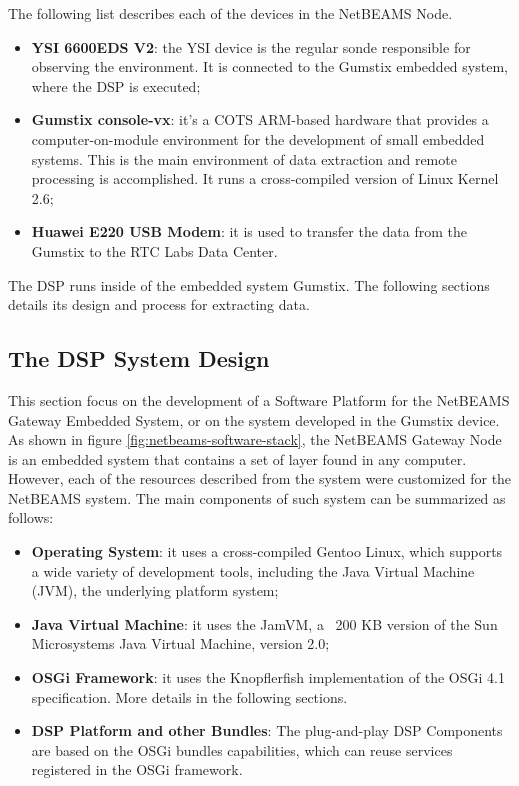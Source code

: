 The following list describes each of the devices in the NetBEAMS Node.

\begin{itemize}
  \item \textbf{YSI 6600EDS V2}: the YSI device is the regular sonde
  responsible for observing the environment. It is connected to the Gumstix
  embedded system, where the DSP is executed;
  \item \textbf{Gumstix console-vx}: it's a COTS ARM-based hardware that
  provides a computer-on-module environment for the development of small
  embedded systems. This is the main environment of data extraction and remote
  processing is accomplished. It runs a cross-compiled version of Linux Kernel
  2.6;
  \item \textbf{Huawei E220 USB Modem}: it is used to transfer the data from the
  Gumstix to the RTC Labs Data Center.
\end{itemize} 

The DSP runs inside of the embedded system Gumstix. The following sections
details its design and process for extracting data.

\subsection{The DSP System Design}

This section focus on the development of a Software Platform for the NetBEAMS
Gateway Embedded System, or on the system developed in the Gumstix device. As
shown in figure \ref{fig:netbeams-software-stack}, the NetBEAMS Gateway Node is
an embedded system that contains a set of layer found in any computer.
However, each of the resources described from the system were customized for
the NetBEAMS system. The main components of such system can be summarized as
follows:

\begin{itemize}
  \item \textbf{Operating System}: it uses a cross-compiled Gentoo Linux, which
  supports a wide variety of development tools, including the Java Virtual Machine
  (JVM), the underlying platform system;
  \item \textbf{Java Virtual Machine}: it uses the JamVM, a ~200 KB version of
  the Sun Microsystems Java Virtual Machine, version 2.0;
  \item \textbf{OSGi Framework}: it uses the Knopflerfish implementation of the
  OSGi 4.1 specification. More details in the following sections.
  \item \textbf{DSP Platform and other Bundles}: The plug-and-play DSP
  Components are based on the OSGi bundles capabilities, which can reuse services registered in the OSGi framework.
\end{itemize}

